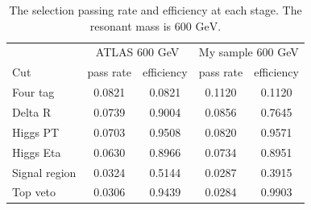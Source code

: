\documentclass[12pt]{article}
\begin{document}
		\begin{table}[htpb]
			\centering
			\caption{The selection passing rate and efficiency at each stage. The resonant mass is $\text{600 GeV}$.}
			\label{tab:signal_selection_efficiency_600GeV}
			\begin{tabular}{l|cc|cc}
							  & \multicolumn{2}{c}{ATLAS 600 GeV} & \multicolumn{2}{|c}{My sample 600 GeV} \\
				Cut           & pass rate   & efficiency  & pass rate     & efficiency    \\ \hline
				Four tag      & 0.0821      & 0.0821      & 0.1120        & 0.1120        \\
				Delta R       & 0.0739      & 0.9004      & 0.0856        & 0.7645        \\
				Higgs PT      & 0.0703      & 0.9508      & 0.0820        & 0.9571        \\
				Higgs Eta     & 0.0630      & 0.8966      & 0.0734        & 0.8951        \\
				Signal region & 0.0324      & 0.5144      & 0.0287        & 0.3915        \\
				Top veto      & 0.0306      & 0.9439      & 0.0284        & 0.9903       	
			\end{tabular}
		\end{table}
\end{document}
